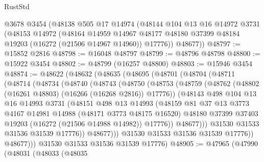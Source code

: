 \begin{lexlean}{RustStd}
\begin{coremodule}
    @3678
    @3454
    (@48138
      @505
      @17
      @14974
      (@48144
        @104
        @13
        @16
        @14972
        @3731
        (@48153
          @14972
          (@48164
            @14959
            @14967
            @48177
            @48180
            @37399
            @48184
            @19203
            (@16272 (@21506 @14967 @14960))
            @17776))
        @48677))
@48797 := @15852 @2816
@48798 := @16048 @48797
@48799 := @48796 @48798
@48800 := @15922 @3454
@48802 := @48799 (@16257 @48800)
@48803 := @15946 @3454
@48874 := @48622
    (@48632
      (@48635
        (@48695
          (@48701
            (@48704
              (@48711
                (@48714
                  (@48734
                    (@48740
                      (@48743
                        (@48750
                          (@48753
                            (@48759
                              (@48762 (@48802 (@16261 @48803) (@16266 (@16268 @2816)) @17776))
                              (@48143
                                @498
                                @104
                                @13
                                @16
                                @14993
                                @3731
                                (@48151
                                  @498
                                  @13
                                  @14993
                                  (@48159
                                    @81
                                    @37
                                    @13
                                    @3773
                                    @4167
                                    @14981
                                    @14988
                                    (@48171 @3773 @48175 @16520)
                                    @48180
                                    @37399
                                    @37403
                                    @19203
                                    (@16272 (@21506 @14988 @14982))
                                    @17776))
                                @48677)))
                          @31530
                          @31533
                          @31536
                          @31539
                          @17776))
                      @48677)))
                @31530
                @31533
                @31536
                @31539
                @17776))
            @48677)))
      @31530
      @31533
      @31536
      @31539
      @17776)
@48905 := @47965
    (@47990
      (@48031
        (@48033
          (@48035

\end{coremodule}
\end{lexlean}

